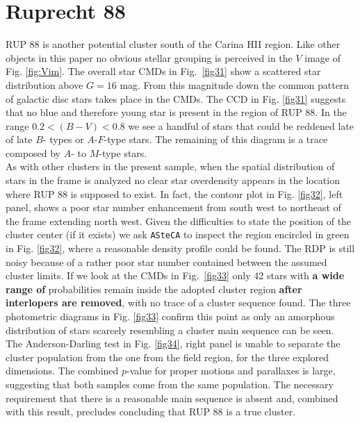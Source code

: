 \documentclass[referee]{aa}
\begin{document}
\section{Ruprecht 88}

RUP 88 is another potential cluster south of the Carina HII region. Like
other objects in this paper no obvious stellar grouping is perceived in the $V$
image of Fig. \ref{fig:Vim}. The overall star CMDs in Fig.~\ref{fig31} show a
scattered star distribution above $G=16$ mag. From this magnitude down the
common pattern of galactic disc stars takes place in the CMDs. The CCD in Fig.
\ref{fig31} suggests that no blue and therefore young star is present in the
region of RUP 88. In the range $0.2<(B-V)<0.8$ we see a handful of stars that
could be reddened late of late $B$- types or $A$-$F$-type stars. The remaining of
this diagram is a trace composed by $A$- to $M$-type stars.\\

As with other clusters in the present sample, when the spatial distribution
of stars in the frame is analyzed no clear star overdensity
appears in the location where RUP 88 is supposed to exist. In fact, the
contour plot in Fig. \ref{fig32}, left panel, shows a poor star number
enhancement from south west to northeast of the frame extending north west.
Given the difficulties to state the position of the cluster center (if it
exists) we ask \texttt{ASteCA} to inspect the region encircled in green in Fig.
\ref{fig32}, where a reasonable density profile could be found. The
RDP is still noisy because of a rather poor star number contained between the
assumed cluster limits.
If we look at the CMDs in Fig.~\ref{fig33} only 42 stars with \textbf{a wide
range of} probabilities remain inside the adopted cluster region 
\textbf{after interlopers are removed}, with no trace of a cluster sequence
found.
The three photometric diagrams in Fig. \ref{fig33} confirm this point as only
an amorphous distribution of stars scarcely resembling a cluster main sequence
can be seen.\\

The Anderson-Darling test in Fig. \ref{fig34}, right panel is unable to
separate the cluster population from the one from the field region, for the
three explored dimensions. The combined $p$-value for proper motions and
parallaxes is large, suggesting that both samples come from the same
population. The necessary requirement that there is a reasonable main
sequence is absent and, combined with this result, precludes
concluding that RUP 88 is a true cluster.
\end{document}
